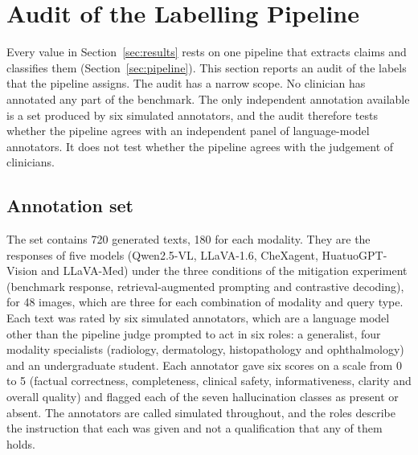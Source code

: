 \section{Audit of the Labelling Pipeline}\label{sec:validation}

Every value in Section~\ref{sec:results} rests on one pipeline that extracts claims and classifies them (Section~\ref{sec:pipeline}). This section reports an audit of the labels that the pipeline assigns. The audit has a narrow scope. No clinician has annotated any part of the benchmark. The only independent annotation available is a set produced by six simulated annotators, and the audit therefore tests whether the pipeline agrees with an independent panel of language-model annotators. It does not test whether the pipeline agrees with the judgement of clinicians.

\subsection{Annotation set}\label{sec:val_set}
The set contains 720 generated texts, 180 for each modality. They are the responses of five models (Qwen2.5-VL, LLaVA-1.6, CheXagent, HuatuoGPT-Vision and LLaVA-Med) under the three conditions of the mitigation experiment (benchmark response, retrieval-augmented prompting and contrastive decoding), for 48 images, which are three for each combination of modality and query type. Each text was rated by six simulated annotators, which are a language model other than the pipeline judge prompted to act in six roles: a generalist, four modality specialists (radiology, dermatology, histopathology and ophthalmology) and an undergraduate student. Each annotator gave six scores on a scale from 0 to 5 (factual correctness, completeness, clinical safety, informativeness, clarity and overall quality) and flagged each of the seven hallucination classes as present or absent. The annotators are called simulated throughout, and the roles describe the instruction that each was given and not a qualification that any of them holds.

